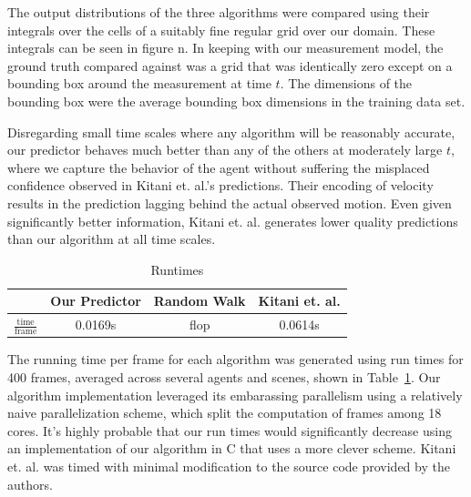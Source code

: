 \documentclass[letterpaper,10pt,conference]{ieeeconf}
\begin{document}
The output distributions of the three algorithms were compared using their integrals over the cells of a suitably fine regular grid over our domain. These integrals can be seen in {figure n}. 
In keeping with our measurement model, the ground truth compared against was a grid that was identically zero except on a bounding box around the measurement at time $t$. The dimensions of the bounding box were the average bounding box dimensions in the training data set. 
\label{fig:auc_vs_time}
\label{fig:total_rocs}
\begin{figure}
\end{figure}

Disregarding small time scales where any algorithm will be reasonably accurate, our predictor behaves much better than any of the others at moderately large $t$, where we capture the  behavior of the agent without suffering the misplaced confidence observed in Kitani et. al.'s predictions. Their encoding of velocity results in the prediction lagging behind the actual observed motion. Even given significantly better information, Kitani et. al. generates lower quality predictions than our algorithm at all time scales. 
\begin{table}
\begin{center}
	\caption{Runtimes}
	\label{tab:time}
	\renewcommand{\arraystretch}{1.5}%
	\begin{tabular}{||c | c c  c ||} 
		\hline
		& Our Predictor & Random Walk & Kitani et. al. \\ [0.5ex] 
		\hline 
		$\frac{\mathrm{time}}{\mathrm{frame}}$ & 0.0169s & flop & 0.0614s \\
		\hline
		
	\end{tabular}
	

\end{center}
\end{table}

The running time per frame for each algorithm was generated using run times for 400 frames, averaged across several agents and scenes, shown in Table~\ref{tab:time}. Our algorithm implementation leveraged its embarassing parallelism using a relatively naive parallelization scheme, which split the computation of frames among 18 cores. It's highly probable that our run times would significantly decrease using an implementation of our algorithm in C that uses a more clever scheme. Kitani et. al. was timed with minimal modification to the source code provided by the authors. 
\end{document}
